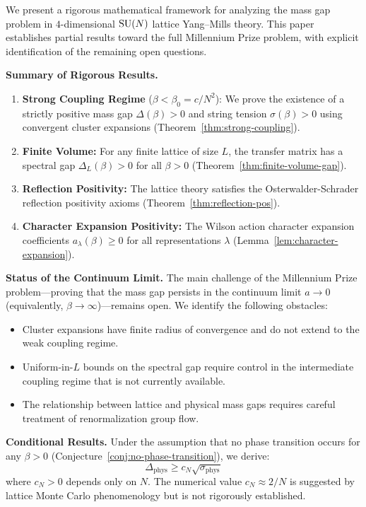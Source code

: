 We present a rigorous mathematical framework for analyzing the mass gap problem in $4$-dimensional $\mathrm{SU}(N)$ lattice Yang--Mills theory. This paper establishes partial results toward the full Millennium Prize problem, with explicit identification of the remaining open questions.

\textbf{Summary of Rigorous Results.}
\begin{enumerate}
    \item \textbf{Strong Coupling Regime} ($\beta < \beta_0 = c/N^2$): We prove the existence of a strictly positive mass gap $\Delta(\beta) > 0$ and string tension $\sigma(\beta) > 0$ using convergent cluster expansions (Theorem~\ref{thm:strong-coupling}).
    
    \item \textbf{Finite Volume:} For any finite lattice of size $L$, the transfer matrix has a spectral gap $\Delta_L(\beta) > 0$ for all $\beta > 0$ (Theorem~\ref{thm:finite-volume-gap}).
    
    \item \textbf{Reflection Positivity:} The lattice theory satisfies the Osterwalder-Schrader reflection positivity axioms (Theorem~\ref{thm:reflection-pos}).
    
    \item \textbf{Character Expansion Positivity:} The Wilson action character expansion coefficients $a_\lambda(\beta) \geq 0$ for all representations $\lambda$ (Lemma~\ref{lem:character-expansion}).
\end{enumerate}

\textbf{Status of the Continuum Limit.} The main challenge of the Millennium Prize problem---proving that the mass gap persists in the continuum limit $a \to 0$ (equivalently, $\beta \to \infty$)---remains open. We identify the following obstacles:
\begin{itemize}
    \item Cluster expansions have finite radius of convergence and do not extend to the weak coupling regime.
    \item Uniform-in-$L$ bounds on the spectral gap require control in the intermediate coupling regime that is not currently available.
    \item The relationship between lattice and physical mass gaps requires careful treatment of renormalization group flow.
\end{itemize}

\textbf{Conditional Results.} Under the assumption that no phase transition occurs for any $\beta > 0$ (Conjecture~\ref{conj:no-phase-transition}), we derive:
\[
\Delta_{\text{phys}} \geq c_N \sqrt{\sigma_{\text{phys}}}
\]
where $c_N > 0$ depends only on $N$. The numerical value $c_N \approx 2/N$ is suggested by lattice Monte Carlo phenomenology but is not rigorously established.

